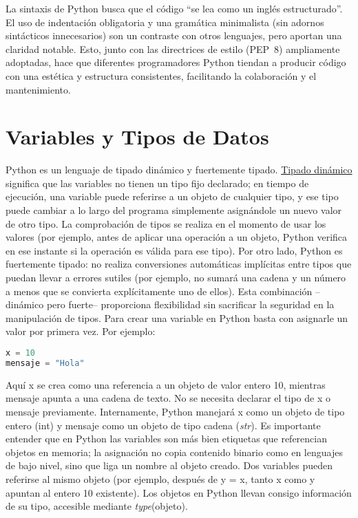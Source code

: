 La sintaxis de Python busca que el código “se lea como un inglés estructurado”. El uso de indentación 
obligatoria y una gramática minimalista (sin adornos sintácticos innecesarios) son un contraste 
con otros lenguajes, pero aportan una claridad notable. Esto, junto con las directrices de estilo 
(PEP 8) ampliamente adoptadas, hace que diferentes programadores Python tiendan a producir 
código con una estética y estructura consistentes, facilitando la colaboración y el mantenimiento.


\section{Variables y Tipos de Datos}
Python es un lenguaje de tipado dinámico y fuertemente tipado. \href{https://typing.python.org/en/latest/spec/concepts.html}{Tipado dinámico} 
significa que las variables no tienen un tipo fijo declarado; en tiempo de ejecución, 
una variable puede referirse a un objeto de cualquier tipo, y ese tipo puede cambiar 
a lo largo del programa simplemente asignándole un nuevo valor de otro tipo. 
La comprobación de tipos se realiza en el momento de usar los valores (por ejemplo, antes de aplicar una operación a un objeto, 
Python verifica en ese instante si la operación es válida para ese tipo). Por otro lado, Python
es fuertemente tipado: no realiza conversiones automáticas implícitas 
entre tipos que puedan llevar a errores sutiles (por ejemplo, no sumará una cadena y un número 
a menos que se convierta explícitamente uno de ellos). Esta combinación –dinámico pero fuerte– 
proporciona flexibilidad sin sacrificar la seguridad en la manipulación de tipos.
Para crear una variable en Python basta con asignarle un valor por primera vez. Por ejemplo:
\begin{lstlisting}[language=Python, caption={Declaración de variables en Python.}]
x = 10
mensaje = "Hola"
\end{lstlisting}

Aquí x se crea como una referencia a un objeto de valor entero 10, mientras mensaje apunta 
a una cadena de texto. No se necesita declarar el tipo de x o mensaje previamente. 
Internamente, Python manejará x como un objeto de tipo entero (int) y mensaje como un 
objeto de tipo cadena (\textit{str}). Es importante entender que en Python las variables son más 
bien etiquetas que referencian objetos en memoria; la asignación no copia contenido binario 
como en lenguajes de bajo nivel, sino que liga un nombre al objeto creado. Dos variables 
pueden referirse al mismo objeto (por ejemplo, después de y = x, tanto x como y apuntan al 
entero 10 existente). Los objetos en Python llevan consigo información de su tipo, 
accesible mediante \textit{type}(objeto).

